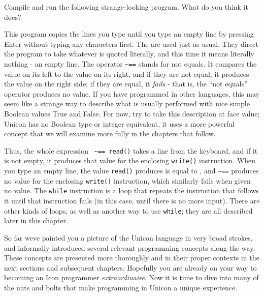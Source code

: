 \noindent Compile and run the following strange-looking program.
What do you think it does?


This program copies the lines you type until you type an empty line by
pressing Enter without typing any characters first. The
\texttt{{\textquotedbl}{\textquotedbl}} are used just as usual. They
direct the program to take whatever is quoted literally, and this time
it means literally nothing - an empty line. The operator
\texttt{\~{}==} stands for {\textquotedbl}not
equals{\textquotedbl}. It compares the value on its left to the value
on its right, and if they are not equal, it produces the value on the
right side; if they are equal, it \textit{fails} - that is, the {\textquotedblleft}not
equals{\textquotedblright} operator produces no value. If you have
programmed in other languages, this may seem like a strange way to
describe what is usually performed with nice simple Boolean values True
and False. For now, try to take this description at face value; Unicon
has no Boolean type or integer equivalent, it uses a more powerful
concept that we will examine more fully in the chapters that follow.

Thus, the whole expression \texttt{{\textquotedbl}{\textquotedbl} \~{}==
read()} takes a line from the keyboard, and if it is not empty, it
produces that value for the enclosing \texttt{write()} instruction.
When you type an empty line, the value \texttt{read()} produces is
equal to \texttt{{\textquotedbl}{\textquotedbl}}, and \texttt{\~{}==}
produces no value for the enclosing \texttt{write()} instruction, which
similarly fails when given no value. The \texttt{while}
instruction is a {\textquotedbl}loop{\textquotedbl} that
repeats the instruction that follows it until that instruction fails
(in this case, until there is no more input). There are other kinds of
loops, as well as another way to use \texttt{while}; they are all
described later in this chapter.

So far we{\textquotesingle}ve painted you a picture of the Unicon
language in very broad strokes, and informally introduced several
relevant programming concepts along the way. These concepts are
presented more thoroughly and in their proper contexts in the next
sections and subsequent chapters. Hopefully you are already on your way
to becoming an Icon programmer \textit{extraordinaire}. Now it is time
to dive into many of the nuts and bolts that make programming in Unicon
a unique experience.

